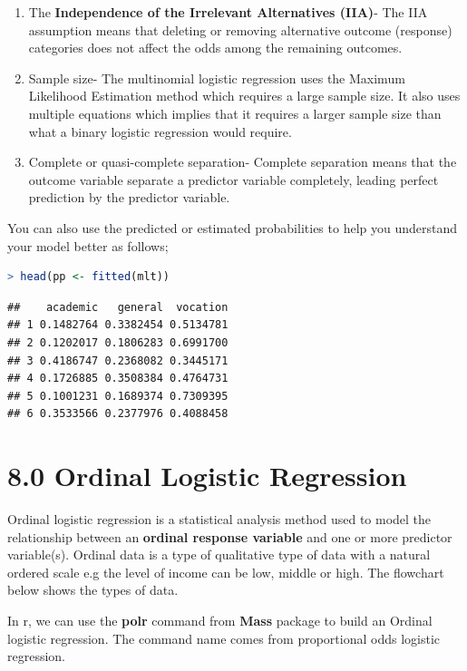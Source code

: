 \documentclass[
]{article}
\begin{document}
\begin{enumerate}
\def\labelenumi{\arabic{enumi}.}
\item
  The \textbf{Independence of the Irrelevant Alternatives (IIA)}- The
  IIA assumption means that deleting or removing alternative outcome
  (response) categories does not affect the odds among the remaining
  outcomes.
\item
  Sample size- The multinomial logistic regression uses the Maximum
  Likelihood Estimation method which requires a large sample size. It
  also uses multiple equations which implies that it requires a larger
  sample size than what a binary logistic regression would require.
\item
  Complete or quasi-complete separation- Complete separation means that
  the outcome variable separate a predictor variable completely, leading
  perfect prediction by the predictor variable.
\end{enumerate}

You can also use the predicted or estimated probabilities to help you
understand your model better as follows;

\begin{lstlisting}[language=R]
> head(pp <- fitted(mlt))
\end{lstlisting}

\begin{lstlisting}
##    academic   general  vocation
## 1 0.1482764 0.3382454 0.5134781
## 2 0.1202017 0.1806283 0.6991700
## 3 0.4186747 0.2368082 0.3445171
## 4 0.1726885 0.3508384 0.4764731
## 5 0.1001231 0.1689374 0.7309395
## 6 0.3533566 0.2377976 0.4088458
\end{lstlisting}

\newpage

\hypertarget{ordinal-logistic-regression}{%
\section{8.0 Ordinal Logistic
Regression}\label{ordinal-logistic-regression}}

Ordinal logistic regression is a statistical analysis method used to
model the relationship between an \textbf{ordinal response variable} and
one or more predictor variable(s). Ordinal data is a type of qualitative
type of data with a natural ordered scale e.g the level of income can be
low, middle or high. The flowchart below shows the types of data.

In r, we can use the \textbf{polr} command from \textbf{Mass} package to
build an Ordinal logistic regression. The command name comes from
proportional odds logistic regression.
\end{document}
